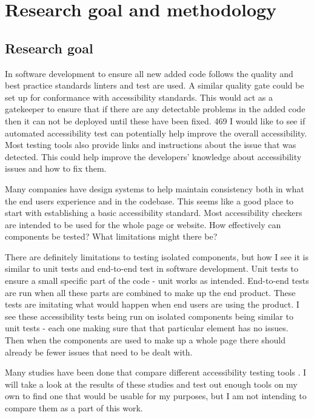 \documentclass{master_thesis}
\begin{document}
\section{Research goal and methodology}
\subsection{Research goal}

In software development to ensure all new added code follows the quality and best practice standards linters and test are used. A similar quality gate could be set up for conformance with accessibility standards. This would act as a gatekeeper to ensure that if there are any detectable problems in the added code then it can not be deployed until these have been fixed.
469
I would like to see if automated accessibility test can potentially help improve the overall accessibility. Most testing tools also provide links and instructions about the issue that was detected. This could help improve the developers' knowledge about accessibility issues and how to fix them.

Many companies have design systems to help maintain consistency both in what the end users experience and in the codebase. This seems like a good place to start with establishing a basic accessibility standard. Most accessibility checkers are intended to be used for the whole page or website. How effectively can components be tested? What limitations might there be?

There are definitely limitations to testing isolated components, but how I see it is similar to unit tests and end-to-end test in software development. Unit tests to ensure a small specific part of the code - unit works as intended. End-to-end tests are run when all these parts are combined to make up the end product. These tests are imitating what would happen when end users are using the product. I see these accessibility tests being run on isolated components being similar to unit tests - each one making sure that that particular element has no issues. Then when the components are used to make up a whole page there should already be fewer issues that need to be dealt with.

Many studies have been done that compare different accessibility testing tools \citep{Alsaeedi2020,Ismailova2022,Sane2021,Vigo2013,RybinKoob2022,Duran2017}. I will take a look at the results of these studies and test out enough tools on my own to find one that would be usable for my purposes, but I am not intending to compare them as a part of this work.
\end{document}
